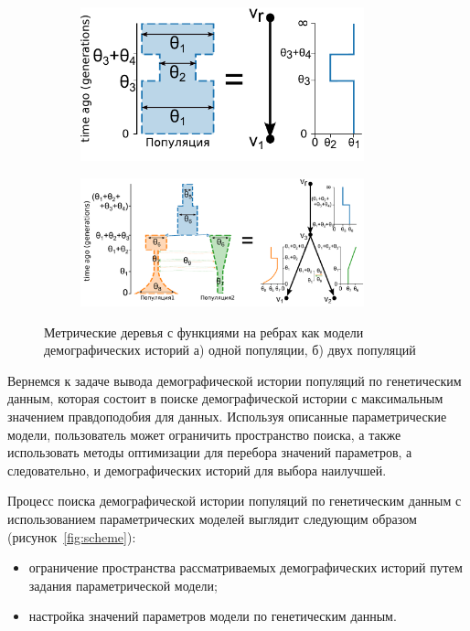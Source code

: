 \begin{figure}[ht]
    \centering
    \begin{subfigure}[b]{.34\textwidth}
    \includegraphics[width=0.9\textwidth]{images/part1/1d_model_metric_tree.pdf}
    \caption{}
    \label{fig:metric_tree:1pop}
    \end{subfigure}%
    \begin{subfigure}[b]{.65\textwidth}
    \centering
    \includegraphics[width=0.9\textwidth]{images/part1/2d_model_metric_tree.pdf}
    \caption{}
    \label{fig:metric_tree:2pop}
    \end{subfigure}
    \caption{Метрические деревья с функциями на ребрах как модели демографических историй а) одной популяции, б) двух популяций}
    \label{fig:metric_tree}
\end{figure}

Вернемся к задаче вывода демографической истории популяций по генетическим данным, которая состоит в поиске демографической истории с максимальным значением правдоподобия для данных.
Используя описанные параметрические модели, пользователь может ограничить пространство поиска, а также использовать методы оптимизации для перебора значений параметров, а следовательно, и демографических историй для выбора наилучшей.

Процесс поиска демографической истории  популяций по генетическим данным с использованием параметрических моделей выглядит следующим образом (рисунок~\ref{fig:scheme}):
\begin{itemize}
    \item ограничение пространства рассматриваемых демографических историй путем задания параметрической модели;
    \item настройка значений параметров модели по генетическим данным.
\end{itemize}

